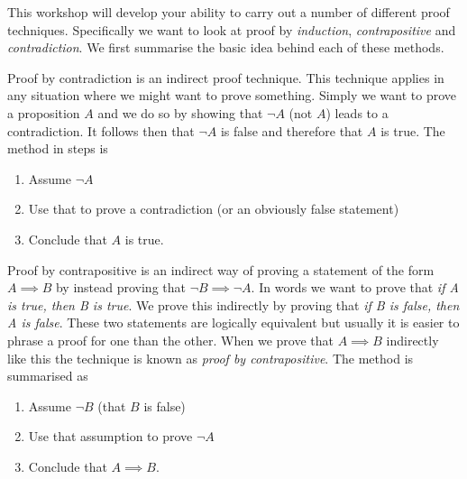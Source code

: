 This workshop will develop your ability to carry out a number of different proof
techniques. Specifically we want to look at proof by \emph{induction},
\emph{contrapositive} and \emph{contradiction}. We first summarise the basic
idea behind each of these methods.

Proof by contradiction is an indirect proof technique. This technique applies in
any situation where we might want to prove something. Simply we want to prove
a proposition $A$ and we do so by showing that $\neg A$ (not $A$) leads to a
contradiction. It follows then that $\neg A$ is false and therefore that $A$
is true. The method in steps is
\begin{enumerate}
  \item Assume $\neg A$
  \item Use that to prove a contradiction (or an obviously false statement)
  \item Conclude that $A$ is true.
\end{enumerate}

Proof by contrapositive is an indirect way of proving a statement of the form
$A\implies B$ by instead proving that $\neg B \implies \neg A$. In words we
want to prove that \emph{if A is true, then B is true}. We prove this
indirectly by proving that \emph{if B is false, then A is false}.
These two statements are logically equivalent but usually it is easier to
phrase a proof for one than the other. When we prove that $A\implies B$
indirectly like this the technique is known as \emph{proof by contrapositive}.
The method is summarised as
\begin{enumerate}
  \item Assume $\neg B$ (that $B$ is false)
  \item Use that assumption to prove $\neg A$
  \item Conclude that $A\implies B$.
\end{enumerate}

